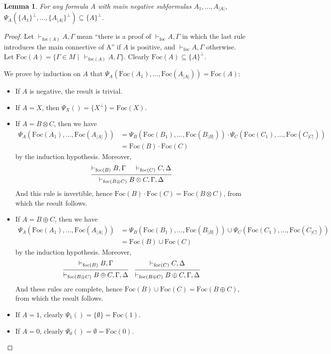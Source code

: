 \documentclass{article}
\newcommand\size[1]{{\lvert #1 \rvert}}
\newcommand\vdashfoc{\vdash_\text{foc}}
\newcommand\vdashfocon[1]{\vdash_{\text{foc}(#1)}}
\newcommand\Foc{\text{Foc}}
\newtheorem{lemma}[theorem]{Lemma}
\begin{document}
\begin{lemma}
    \label{positive_phase}
    For any formula A with main negative subformulas $A_1, \dots, A_\size{A}$, $\Psi_A(\{A_1\}^\perp, \dots, \{A_\size{A}\}^\perp) \subseteq \{A\}^\perp$.
\end{lemma}
\begin{proof}
    Let $\vdashfocon{A} A, \Gamma$ mean ``there is a proof of $\vdashfoc A, \Gamma$ in which the last rule introduces the main connective of A'' if $A$ is positive, and $\vdashfoc A, \Gamma$ otherwise.
    Let $\Foc(A) = \{\Gamma \in M \mid\, \vdashfocon{A} A, \Gamma\}$. Clearly $\Foc(A) \subseteq \{A\}^\perp$.

    We prove by induction on $A$ that $\Psi_A(\Foc(A_1), \dots, \Foc(A_\size{A})) = \Foc(A)$:
    \begin{itemize}
        \item If $A$ is negative, the result is trivial.
        \item If $A = X$, then $\Psi_X() = \{X^\perp\} = \Foc(X)$.
        \item If $A = B \otimes C$, then we have \begin{align*}
            \Psi_A(\Foc(A_1), \dots, \Foc(A_\size{A})) &= \Psi_B(\Foc(B_1), \dots, \Foc(B_\size{B})) \cdot \Psi_C(\Foc(C_1), \dots, \Foc(C_\size{C})) \\
            &= \Foc(B) \cdot \Foc(C)
        \end{align*} by the induction hypothesis. Moreover,
        $$\begin{prooftree}
            \hypo{\vdashfocon{B} B, \Gamma}
            \hypo{\vdashfocon{C} C, \Delta}
            \infer2{\vdashfocon{B \otimes C} B \otimes C, \Gamma, \Delta}
        \end{prooftree}$$
        And this rule is invertible, hence $\Foc(B) \cdot \Foc(C) = \Foc(B \otimes C)$, from which the result follows.
        \item If $A = B \oplus C$, then we have \begin{align*}
            \Psi_A(\Foc(A_1), \dots, \Foc(A_\size{A})) &= \Psi_B(\Foc(B_1), \dots, \Foc(B_\size{B})) \cup \Psi_C(\Foc(C_1), \dots, \Foc(C_\size{C})) \\
            &= \Foc(B) \cup \Foc(C)
        \end{align*} by the induction hypothesis. Moreover,
        $$\begin{prooftree}
            \hypo{\vdashfocon{B} B, \Gamma}
            \infer1{\vdashfocon{B \oplus C} B \oplus C, \Gamma, \Delta}
        \end{prooftree}
        \quad
        \begin{prooftree}
            \hypo{\vdashfocon{C} C, \Delta}
            \infer1{\vdashfocon{B \oplus C} B \oplus C, \Gamma, \Delta}
        \end{prooftree}$$
        And these rules are complete, hence $\Foc(B) \cup \Foc(C) = \Foc(B \oplus C)$, from which the result follows.
        \item If $A = 1$, clearly $\Psi_1() = \{\emptyset\} = \Foc(1)$.
        \item If $A = 0$, clearly $\Psi_0() = \emptyset = \Foc(0)$.
    \end{itemize}


\end{proof}
\end{document}
